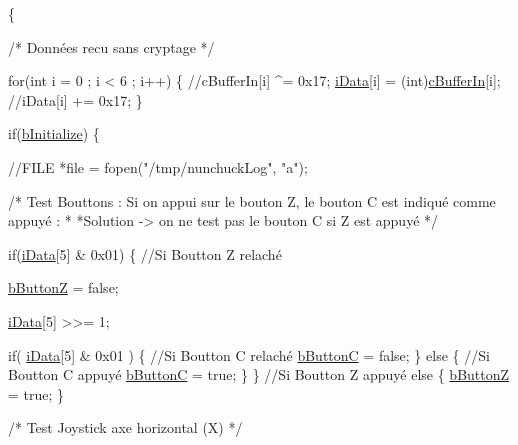\begin{DoxyCode}
                              \{

    \textcolor{comment}{/*  Données recu sans cryptage  */}

    \textcolor{keywordflow}{for}(\textcolor{keywordtype}{int} i = 0 ; i < 6 ; i++) \{
        \textcolor{comment}{//cBufferIn[i] ^= 0x17;}
        \hyperlink{classNunchuck_a6bf3cbe405e9611658f1a6bbc1cd56b4}{iData}[i]      = (int)\hyperlink{classNunchuck_a1bd7122f88582d12ab2ac5d3c8c7b8f8}{cBufferIn}[i];
        \textcolor{comment}{//iData[i]     += 0x17;}
    \}


    \textcolor{keywordflow}{if}(\hyperlink{classNunchuck_a3ecbcb3a01a247605b4f0a37b579581d}{bInitialize}) \{

        \textcolor{comment}{//FILE *file = fopen("/tmp/nunchuckLog", "a");}

        \textcolor{comment}{/*  Test Bouttons : Si on appui sur le bouton Z, le bouton C est
       indiqué comme appuyé :}
\textcolor{comment}{         *}
\textcolor{comment}{         *Solution -> on ne test pas le bouton C si Z est appuyé    */}

        \textcolor{keywordflow}{if}(\hyperlink{classNunchuck_a6bf3cbe405e9611658f1a6bbc1cd56b4}{iData}[5] & 0x01) \{                           \textcolor{comment}{//Si Boutton Z
       relaché}

            \hyperlink{classNunchuck_a0db1f3d2f58fafda23a5af3936c12598}{bButtonZ} = \textcolor{keyword}{false};

            \hyperlink{classNunchuck_a6bf3cbe405e9611658f1a6bbc1cd56b4}{iData}[5] >>= 1;

            \textcolor{keywordflow}{if}( \hyperlink{classNunchuck_a6bf3cbe405e9611658f1a6bbc1cd56b4}{iData}[5] & 0x01 ) \{                     \textcolor{comment}{//Si Boutton C
       relaché}
                \hyperlink{classNunchuck_a1d5cac3b603b3060984e3184d795561d}{bButtonC} = \textcolor{keyword}{false};
            \}
            \textcolor{keywordflow}{else} \{                                      \textcolor{comment}{//Si Boutton C appuyé}
                \hyperlink{classNunchuck_a1d5cac3b603b3060984e3184d795561d}{bButtonC} = \textcolor{keyword}{true};
            \}
        \}                                               \textcolor{comment}{//Si Boutton Z appuyé}
        \textcolor{keywordflow}{else} \{
            \hyperlink{classNunchuck_a0db1f3d2f58fafda23a5af3936c12598}{bButtonZ} = \textcolor{keyword}{true};
        \}

        \textcolor{comment}{/*  Test Joystick axe horizontal (X)    */}


\end{DoxyCode}
